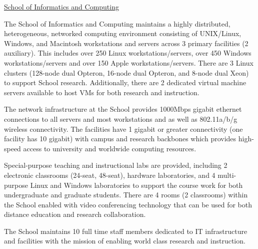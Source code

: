 \documentclass[11pt]{article}
\begin{document}
\bigskip
\centerline{\Large{\underline{School of Informatics and Computing}}}
\bigskip

\noindent The School of Informatics and Computing maintains a highly
distributed, heterogeneous, networked computing environment consisting of
UNIX/Linux, Windows, and Macintosh workstations and servers across 3 primary
facilities (2 auxiliary). This includes over 250 Linux workstations/servers,
over 450 Windows workstations/servers and over 150 Apple
workstations/servers. There are 3 Linux clusters (128-node dual Opteron,
16-node dual Opteron, and 8-node dual Xeon) to support School
research. Additionally, there are 2 dedicated virtual machine servers
available to host VMs for both research and instruction.

The network infrastructure at the School provides 1000Mbps gigabit ethernet
connections to all servers and most workstations and as well as 802.11a/b/g
wireless connectivity. The facilities have 1 gigabit or greater connectivity
(one facility has 10 gigabit) with campus and research backbones which
provides high-speed access to university and worldwide computing resources.

Special-purpose teaching and instructional labs are provided, including 2
electronic classrooms (24-seat, 48-seat), hardware laboratories, and 4
multi-purpose Linux and Windows laboratories to support the course work for
both undergraduate and graduate students.  There are 4 rooms (2 classrooms)
within the School enabled with video conferencing technology that can be used
for both distance education and research collaboration.

The School maintains 10 full time staff members dedicated to IT
infrastructure and facilities with the mission of enabling world class
research and instruction.
\end{document}

